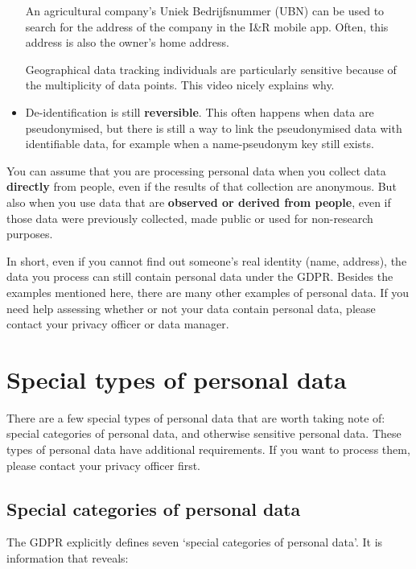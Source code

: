 \documentclass[
]{book}
\begin{document}
\begin{itemize}
  An agricultural company's Uniek Bedrijfsnummer (UBN) can be used to
  search for the address of the company in the
  I\&R mobile app.
  Often, this address is also the owner's home address.

  Geographical data tracking individuals are particularly sensitive
  because of the multiplicity of data points.
  This video
  nicely explains why.
\item
  De-identification is still \textbf{reversible}. This often happens when data are
  pseudonymised, but there is still a way to link the pseudonymised data with
  identifiable data, for example when a name-pseudonym key still exists.
\end{itemize}

You can assume that you are processing personal data when you collect data
\textbf{directly} from people, even if the results of that collection are anonymous. But
also when you use data that are \textbf{observed or derived from people}, even if those
data were previously collected, made public or used for non-research purposes.

In short, even if you cannot find out someone's real identity (name, address),
the data you process can still contain personal data under the GDPR. Besides
the examples mentioned here, there are many
other examples of personal data. If you need help assessing whether or not your
data contain personal data, please contact your
privacy officer
or data manager.

\hypertarget{special-types-personal-data}{%
\section{Special types of personal data}\label{special-types-personal-data}}

There are a few special types of personal data that are worth taking note of:
special categories of personal data, and otherwise sensitive personal data.
These types of personal data have additional requirements. If you want to
process them, please contact your
privacy officer
first.

\hypertarget{special-categories-of-personal-data}{%
\subsection{Special categories of personal data}\label{special-categories-of-personal-data}}

The GDPR explicitly defines seven `special categories of personal data'. It is
information that reveals:
\end{document}
